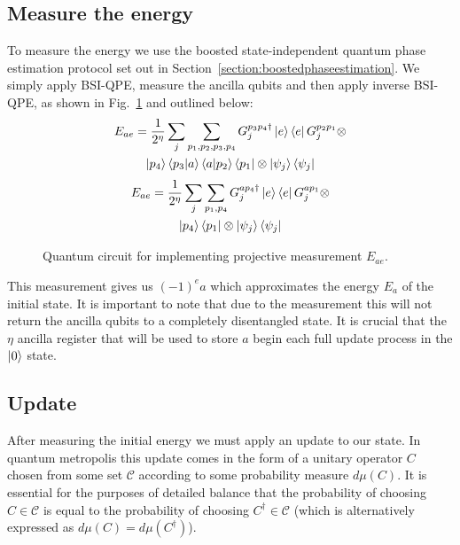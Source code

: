 \documentclass[aps,floatfix,10pt,amssymb,amsfont,amsmath,superscriptaddress,float,nofootinbib,longbibliography,nobalancelastpage,twocolumn]{revtex4-2}
\begin{document}
\subsection{Measure the energy}
\label{section:energymeasurement}
To measure the energy we use the boosted state-independent quantum phase estimation protocol set out in Section~\ref{section:boostedphaseestimation}. We simply apply BSI-QPE, measure the ancilla qubits and then apply inverse BSI-QPE, as shown in Fig.~\ref{fig:Ecircuit} and outlined below:
\begin{multline}
    E_{ae} = \frac{1}{2^{\eta}}\sum_j\sum_{p_1,p_2,p_3,p_4} G_j^{p_3p_4 \dagger}\ket{e}\bra{e}G_j^{p_2p_1}\otimes\\\ket{p_4}\braket{p_3|a}\braket{a|p_2}\bra{p_1}\otimes\ket{\psi_j}\bra{\psi_j}
\end{multline}
\begin{multline}
        E_{ae} = \frac{1}{2^{\eta}}\sum_j\sum_{p_1,p_4} G_j^{ap_4 \dagger}\ket{e}\bra{e}G_j^{ap_1}\otimes\\\ket{p_4}\bra{p_1}\otimes\ket{\psi_j}\bra{\psi_j}
\end{multline}
\begin{figure}

\caption{Quantum circuit for implementing projective measurement $E_{ae}$. }
\label{fig:Ecircuit}
\end{figure}
This measurement gives us $(-1)^ea$ which approximates the energy $E_a$ of the initial state. It is important to note that due to the measurement this will not return the ancilla qubits to a completely disentangled state. It is crucial that the $\eta$ ancilla register that will be used to store $a$ begin each full update process in the $\ket{0}$ state. 
\subsection{Update}
\label{section:update}
After measuring the initial energy we must apply an update to our state. In quantum metropolis this update comes in the form of a unitary operator $C$ chosen from some set $\mathcal{C}$ according to some probability measure $d\mu(C)$. It is essential for the purposes of detailed balance that the probability of choosing $C \in \mathcal{C}$ is equal to the probability of choosing $C^{\dagger} \in \mathcal{C}$ (which is alternatively expressed as $d\mu(C) = d\mu(C^{\dagger})$).
\end{document}
